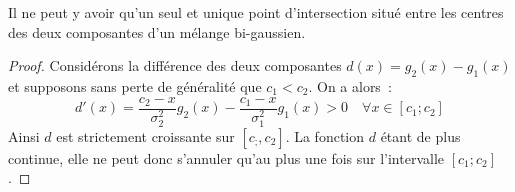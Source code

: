 \documentclass[main.tex]{subfiles}
\begin{document}
\begin{thm}\label{thm:anxe_pt_unique}
Il ne peut y avoir qu'un seul et unique point d'intersection situé entre les centres des deux composantes d'un mélange bi-gaussien.
\end{thm}

\begin{proof}
Considérons la différence des deux composantes $d(x)=g_2(x)-g_1(x)$ et supposons sans perte de généralité que $c_1<c_2$. On a alors~:
$$d'(x) = \frac{c_2-x}{\sigma_2^2}g_2(x) - \frac{c_1-x}{\sigma_1^2} g_1(x) >0 \quad \forall x \in [c_1; c_2] $$
Ainsi $d$ est strictement croissante sur $[c_;,c_2]$. La fonction $d$ étant de plus continue, elle ne peut donc s'annuler qu'au plus une fois sur l'intervalle $[c_1;c_2]$.
\end{proof}
\end{document}

